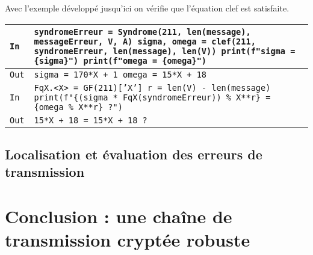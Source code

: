 \documentclass[titlepage]{article}
\begin{document}
        
        
        Avec l'exemple développé jusqu'ici on vérifie que l'équation clef est satisfaite.

        \begin{tabularx}{12cm}{|p{0.60cm}|X|}
            \hline
            \rowcolor{gray}
            \texttt{In}
            & 
            \texttt{syndromeErreur = Syndrome(211, len(message), \newline
            messageErreur, V, A) \newline
            sigma, omega = clef(211, syndromeErreur, len(message), len(V)) \newline
            print(f"sigma = \{sigma\}") \newline
            print(f"omega = \{omega\}")}
            \\
            \hline
            \texttt{Out}
            &
            \texttt{sigma = 170*X + 1 \newline
            omega = 15*X + 18}
            \\
            \hline
            \rowcolor{gray}
            \texttt{In}
            & 
            \texttt{FqX.<X> = GF(211)['X'] \newline
            r = len(V) - len(message) \newline
            print(f"\{(sigma * FqX(syndromeErreur)) \% X**r\} = \{omega \% X**r\} ?")}
            \\
            \hline
            \texttt{Out}
            &
            \texttt{15*X + 18 = 15*X + 18 ?}
            \\
            \hline
        \end{tabularx}
        \bigbreak

        \subsection{Localisation et évaluation des erreurs de transmission}
    \section{Conclusion : une chaîne de transmission cryptée robuste}
\end{document}
